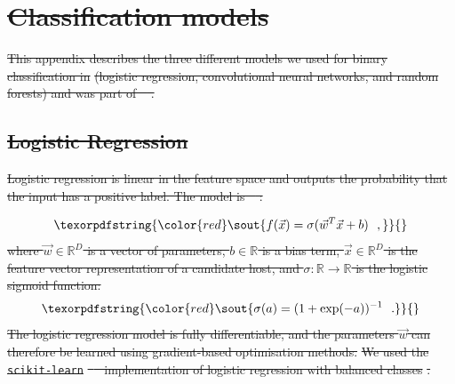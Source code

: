 \documentclass[11pt, a4paper]{book}
\providecommand{\DIFdeltex}[1]{{\protect\color{red}\sout{#1}}}                      %
\providecommand{\DIFdel}[1]{\texorpdfstring{\DIFdeltex{#1}}{}} %
\begin{document}
\section{\DIFdel{Classification models}}%
\addtocounter{section}{-1}%

\DIFdel{This appendix describes the three different models we used for binary classification in }%
\DIFdel{(logistic
  regression, convolutional neural networks, and random forests) and was part of \mbox{%
\citet{alger18radio}}\hspace{0pt}%
.
}%

\subsection{\DIFdel{Logistic Regression}}
\addtocounter{subsection}{-1}%
\DIFdel{Logistic regression is linear in the feature space and outputs the
    probability that the input has a positive label. The model is
    \mbox{%
\citep{bishop06ml}}\hspace{0pt}%
:
}%

\begin{displaymath}
        \DIFdel{f(\vec x) = \sigma(\vec w^T \vec x + b) \,\,\,\,,
    }\end{displaymath}%
\DIFdel{where $\vec w \in \mathbb{R}^D$ is a vector of parameters, $b \in \mathbb{R}$ is a bias term, $\vec x \in \mathbb{R}^D$ is the feature vector representation of a candidate host, and $\sigma : \mathbb{R} \to \mathbb{R}$ is the logistic sigmoid function: }\begin{displaymath}
        \DIFdel{\sigma(a) = (1 + \mathrm{exp}(-a))^{-1}\,\,\,\,.
    }\end{displaymath}%
    \DIFdel{The logistic regression model is fully differentiable, and the parameters
    $\vec w$ can therefore be learned using gradient-based optimisation
    methods. }%
\DIFdel{We used the }\texttt{\DIFdel{scikit-learn}} %
\DIFdel{\mbox{%
\citep{pedregosa11sklearn}
    }\hspace{0pt}%
implementation of logistic regression with balanced classes}%
\DIFdel{.
}%
\end{document}
